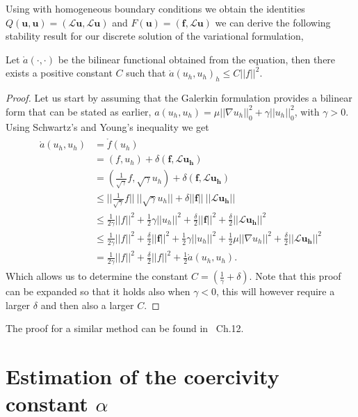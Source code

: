 Using  with homogeneous boundary conditions we obtain the identities $Q(\mathbf{u},\mathbf{u}) = (\mathcal{L}\mathbf{u},\mathcal{L}\mathbf{u})$ and $F(\mathbf{u}) = (\mathbf{f},\mathcal{L}\mathbf{u})$ we can derive the following stability result for our discrete solution of the variational formulation, 
\begin{lemma}
	Let $\mathring{a}(\cdot,\cdot)$ be the bilinear functional obtained from the equation, then there exists a positive constant $C$ such that $\mathring{a}(u_h,u_h)_h \leq C ||f||^2$.
	\label{lemmaStability}
\end{lemma}

\begin{proof}
Let us start by assuming that the Galerkin formulation provides a bilinear form that can be stated as earlier, $a(u_h,u_h)= \mu||\nabla u_h||^2_0 + \gamma||u_h||^2_0$, with $\gamma > 0$. Using Schwartz's and Young's inequality we get 
%
\begin{align}
	\begin{split}
	\mathring{a}(u_h,u_h) &= \mathring{f}(u_h) \\
	&= (f,u_h) + \delta(\mathbf{f},\mathcal{L}\mathbf{u_h}) \\
	&= (\frac{1}{\sqrt{\gamma}}f,\sqrt{\gamma}u_h) + \delta(\mathbf{f},\mathcal{L}\mathbf{u_h}) \\
	&\leq ||\frac{1}{\sqrt{\gamma}}f||\:||\sqrt{\gamma}u_h||+\delta||\mathbf{f}||\:||\mathcal{L}\mathbf{u_h}|| \\
	&\leq \frac{1}{2\gamma}||f||^2 + \frac{1}{2}\gamma||u_h||^2 + \frac{\delta}{2}||\mathbf{f}||^2 + \frac{\delta}{2}||\mathcal{L}\mathbf{u_h}||^2 \\
	&\leq \frac{1}{2\gamma}||f||^2 + \frac{\delta}{2}||\mathbf{f}||^2 + \frac{1}{2}\gamma||u_h||^2 + \frac{1}{2}\mu||\nabla u_h||^2 + \frac{\delta}{2}||\mathcal{L}\mathbf{u_h}||^2 \\
	&= \frac{1}{2\gamma}||f||^2 + \frac{\delta}{2}||f||^2 + \frac{1}{2}\mathring{a}(u_h,u_h).
	\end{split}
	\label{eq:derivationStabilityResult}
\end{align}
%
Which allows us to determine the constant $C= (\frac{1}{\gamma}+\delta)$. Note that this proof can be expanded so that it holds also when $\gamma <0$, this will however require a larger $\delta$ and then also a larger $C$.	
\end{proof}
The proof for a similar method can be found in~\cite{Quarteroni} Ch.12. 
\section{Estimation of the coercivity constant $\alpha$}

